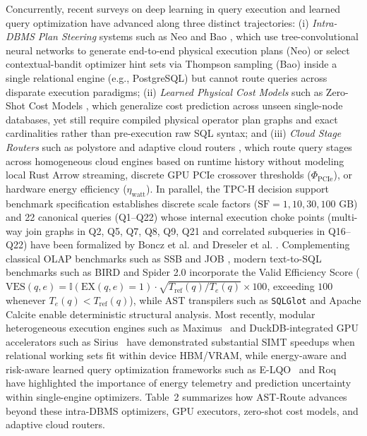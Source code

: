 \documentclass[10pt,a4paper]{article}
\begin{document}
Concurrently, recent surveys on deep learning in query execution \cite{milicevic2024dlquery} and learned query optimization have advanced along three distinct trajectories: (i) \emph{Intra-DBMS Plan Steering} systems such as Neo \cite{marcus2019neo} and Bao \cite{marcus2021bao}, which use tree-convolutional neural networks to generate end-to-end physical execution plans (Neo) or select contextual-bandit optimizer hint sets via Thompson sampling (Bao) inside a single relational engine (e.g., PostgreSQL) but cannot route queries across disparate execution paradigms; (ii) \emph{Learned Physical Cost Models} such as Zero-Shot Cost Models \cite{hilprecht2022zeroshot}, which generalize cost prediction across unseen single-node databases, yet still require compiled physical operator plan graphs and exact cardinalities rather than pre-execution raw SQL syntax; and (iii) \emph{Cloud Stage Routers} such as polystore and adaptive cloud routers \cite{tan2023stage, gupta2023adaptive}, which route query stages across homogeneous cloud engines based on runtime history without modeling local Rust Arrow streaming, discrete GPU PCIe crossover thresholds ($\Phi_{\text{PCIe}}$), or hardware energy efficiency ($\eta_{\text{watt}}$). In parallel, the TPC-H decision support benchmark specification \cite{tpc2022tpch} establishes discrete scale factors ($\text{SF}=1, 10, 30, 100\text{ GB}$) and 22 canonical queries (Q1--Q22) whose internal execution choke points (multi-way join graphs in Q2, Q5, Q7, Q8, Q9, Q21 and correlated subqueries in Q16--Q22) have been formalized by Boncz et al. \cite{boncz2014tpch} and Dreseler et al. \cite{dreseler2020quantifying}. Complementing classical OLAP benchmarks such as SSB \cite{oneil2009ssb} and JOB \cite{leis2015job}, modern text-to-SQL benchmarks such as BIRD \cite{li2023bird} and Spider 2.0 \cite{lei2025spider2} incorporate the Valid Efficiency Score ($\text{VES}(q,e) = \mathbb{I}(\text{EX}(q,e)=1)\cdot\sqrt{T_{\text{ref}}(q)/T_e(q)}\times 100$, exceeding $100$ whenever $T_e(q) < T_{\text{ref}}(q)$), while AST transpilers such as \texttt{SQLGlot} \cite{mao2024sqlglot} and Apache Calcite \cite{begoli2018calcite} enable deterministic structural analysis. Most recently, modular heterogeneous execution engines such as Maximus~\cite{kabic2025maximus} and DuckDB-integrated GPU accelerators such as Sirius~\cite{yogatama2025sirius} have demonstrated substantial SIMT speedups when relational working sets fit within device HBM/VRAM, while energy-aware and risk-aware learned query optimization frameworks such as E-LQO~\cite{liang2026elqo} and Roq~\cite{roq2024risk} have highlighted the importance of energy telemetry and prediction uncertainty within single-engine optimizers. Table~2 summarizes how AST-Route advances beyond these intra-DBMS optimizers, GPU executors, zero-shot cost models, and adaptive cloud routers.
\end{document}
